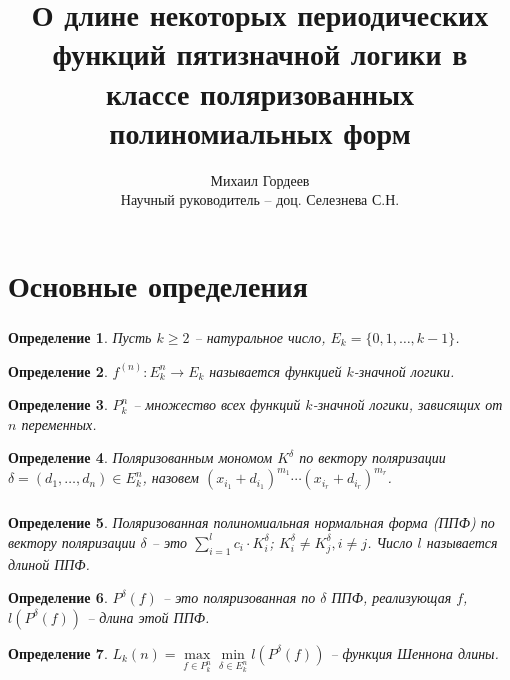 \documentclass[t]{beamer}
\title{О длине некоторых периодических функций пятизначной логики в классе поляризованных
    полиномиальных форм}
\author{Михаил Гордеев\\
\bigskip
Научный руководитель -- доц. Селезнева С.Н.\\}
\date{}
\newtheorem*{mydef}{Определение}
\begin{document}

\section{Основные определения}
\begin{frame}
\frametitle{\insertsection}
\begin{mydef}
Пусть $k \geqslant 2$ -- натуральное число, $E_k = \{0, 1, \dots, k - 1\}$.
\end{mydef}

\begin{mydef}
$f^{(n)} : E_k^n \rightarrow E_k$ называется функцией $k$-значной логики.
\end{mydef}

\begin{mydef}
$P_k^n$ -- множество всех функций $k$-значной логики, зависящих от $n$ переменных.
\end{mydef}

\begin{mydef}
Поляризованным мономом $K^{\delta}$ по вектору поляризации
$\delta = (d_1, \dots, d_n) \in E_k^n$, назовем
$(x_{i_1} + d_{i_1} )^{m_1}\cdots(x_{i_r} + d_{i_r})^{m_r}$.
\end{mydef}
\end{frame}

\begin{frame}
\frametitle{\insertsection}
\begin{mydef}
Поляризованная полиномиальная нормальная форма (ППФ) по вектору поляризации
$\delta$ -- это $\sum\limits_{i=1}^lc_i \cdot K^{\delta}_i$; $K^{\delta}_i \neq K^{\delta}_j,
i \neq j$. Число $l$ называется длиной ППФ.
\end{mydef}

\begin{mydef}
$P^{\delta}(f)$ -- это поляризованная по $\delta$ ППФ, реализующая $f$, $l(P^{\delta}(f))$ --
длина этой ППФ.
\end{mydef}

\begin{mydef}
$L_k(n) = \max\limits_{f\in P_k^n} \min\limits_{\delta \in E_k^n} l(P^{\delta}(f))$ -- функция
Шеннона длины.
\end{mydef}
\end{frame}
\end{document}
